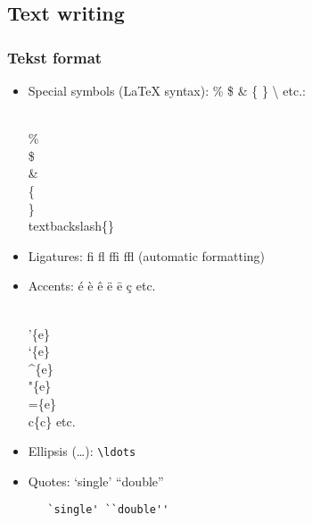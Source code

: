 \documentclass[aspectratio=169]{beamer}
\begin{document}
\subsection{Text writing}

\begin{frame}[fragile]
 \frametitle{Tekst format}

 \begin{itemize}
   \item<+-> Special symbols ({\LaTeX} syntax): \% \$ \& \{ \} \textbackslash{} etc.: \\
   \begin{semiverbatim}
     \\\% \\\$ \\\& \\\{ \\\} \\textbackslash\{\}
   \end{semiverbatim}
   \item<+-> Ligatures: \textrm{fi fl ffi ffl} (automatic formatting)
   \item<+-> Accents: \'{e} \`{e} \^{e} \"{e} \={e} \c{c} etc.
   \begin{semiverbatim}
     \\'\{e\} \\`\{e\} \\^\{e\} \\"\{e\} \\=\{e\} \\c\{c\} etc.
   \end{semiverbatim}
   \item<+-> Ellipsis (\ldots): \texttt{\textbackslash{}ldots}
   \item<+-> Quotes: `single' ``double''
   \begin{verbatim}
   `single' ``double''
   \end{verbatim}
 \end{itemize}
\end{frame}
\end{document}
